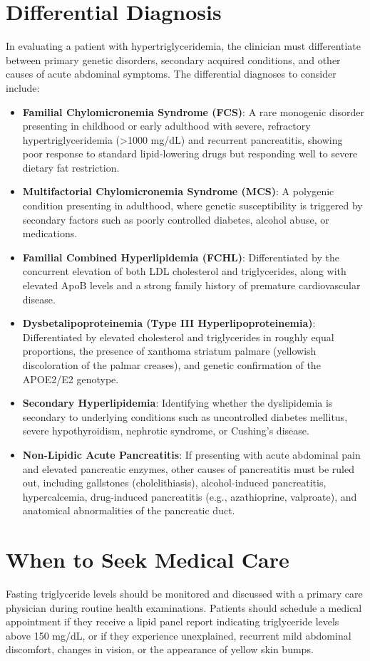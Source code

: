\section*{Differential Diagnosis}
In evaluating a patient with hypertriglyceridemia, the clinician must differentiate between primary genetic disorders, secondary acquired conditions, and other causes of acute abdominal symptoms. The differential diagnoses to consider include:
\begin{itemize}
    \item \textbf{Familial Chylomicronemia Syndrome (FCS)}: A rare monogenic disorder presenting in childhood or early adulthood with severe, refractory hypertriglyceridemia (>1000 mg/dL) and recurrent pancreatitis, showing poor response to standard lipid-lowering drugs but responding well to severe dietary fat restriction.
    \item \textbf{Multifactorial Chylomicronemia Syndrome (MCS)}: A polygenic condition presenting in adulthood, where genetic susceptibility is triggered by secondary factors such as poorly controlled diabetes, alcohol abuse, or medications.
    \item \textbf{Familial Combined Hyperlipidemia (FCHL)}: Differentiated by the concurrent elevation of both LDL cholesterol and triglycerides, along with elevated ApoB levels and a strong family history of premature cardiovascular disease.
    \item \textbf{Dysbetalipoproteinemia (Type III Hyperlipoproteinemia)}: Differentiated by elevated cholesterol and triglycerides in roughly equal proportions, the presence of xanthoma striatum palmare (yellowish discoloration of the palmar creases), and genetic confirmation of the APOE2/E2 genotype.
    \item \textbf{Secondary Hyperlipidemia}: Identifying whether the dyslipidemia is secondary to underlying conditions such as uncontrolled diabetes mellitus, severe hypothyroidism, nephrotic syndrome, or Cushing's disease.
    \item \textbf{Non-Lipidic Acute Pancreatitis}: If presenting with acute abdominal pain and elevated pancreatic enzymes, other causes of pancreatitis must be ruled out, including gallstones (cholelithiasis), alcohol-induced pancreatitis, hypercalcemia, drug-induced pancreatitis (e.g., azathioprine, valproate), and anatomical abnormalities of the pancreatic duct.
\end{itemize}

\section*{When to Seek Medical Care}
Fasting triglyceride levels should be monitored and discussed with a primary care physician during routine health examinations. Patients should schedule a medical appointment if they receive a lipid panel report indicating triglyceride levels above 150 mg/dL, or if they experience unexplained, recurrent mild abdominal discomfort, changes in vision, or the appearance of yellow skin bumps.

